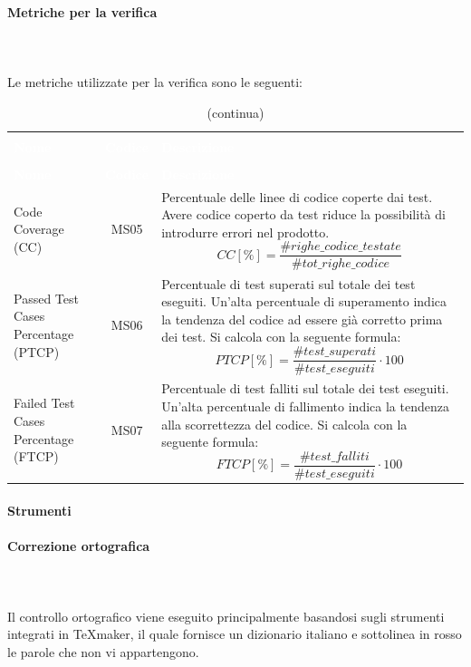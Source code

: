 \paragraph{Metriche per la verifica} \mbox{} \\ \mbox{} \\
Le metriche utilizzate per la verifica sono le seguenti:
\begin{longtable}{ C{4.5cm} c L{9.5cm} }
	\caption{Metriche per la verifica}\\
		\textcolor{white}{\textbf{Nome}} & \textcolor{white}{\textbf{Codice}} & \centerline{\textcolor{white}{\textbf{Descrizione}}} \\
		\endfirsthead
		\caption[]{(continua)} \\
		\textcolor{white}{\textbf{Nome}} & \textcolor{white}{\textbf{Codice}} & \centerline{\textcolor{white}{\textbf{Descrizione}}} \\
		\endhead
		Code Coverage (CC) & MS05 & Percentuale delle linee di codice coperte dai test. Avere codice coperto da test riduce la possibilità di introdurre errori nel prodotto. 
		\[ CC[\%] = \frac{\#righe\_codice\_testate}{\#tot\_righe\_codice}\] \\
		Passed Test Cases Percentage (PTCP) & MS06 & Percentuale di test superati sul totale dei test eseguiti. Un'alta percentuale di superamento indica la tendenza del codice ad essere già corretto prima dei test. Si calcola con la seguente
formula:
		\[ PTCP[\%] = \frac{\#test\_superati}{\#test\_eseguiti}\cdot 100 \] \\
		Failed Test Cases Percentage (FTCP) & MS07 & Percentuale di test falliti sul totale dei test eseguiti. Un'alta percentuale di fallimento indica la tendenza
alla scorrettezza del codice. Si calcola con la seguente formula:
\[ FTCP[\%] = \frac{\#test\_falliti}{\#test\_eseguiti}\cdot 100 \] \\
\end{longtable}

\paragraph{Strumenti}

\paragraph*{Correzione ortografica} \mbox{} \\ \mbox{} \\
Il controllo ortografico viene eseguito principalmente basandosi sugli strumenti integrati in \TeX{}maker, il quale fornisce un dizionario italiano e sottolinea in rosso le parole che non vi appartengono. 
\
